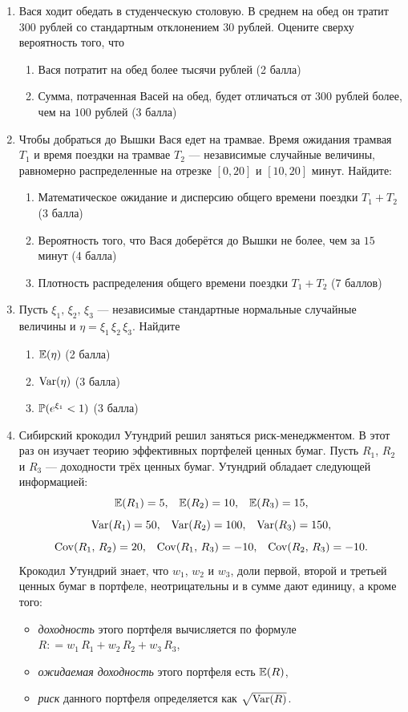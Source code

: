 \begin{enumerate}
    \item Вася ходит обедать в студенческую столовую. В среднем на обед он тратит
    $300$ рублей со стандартным отклонением $30$ рублей. Оцените сверху вероятность
    того, что
    \begin{enumerate}
    \item Вася потратит на обед более тысячи рублей (2 балла)
\item Сумма, потраченная Васей на обед, будет отличаться от $300$ рублей более,
чем на $100$ рублей (3 балла)
\end{enumerate}

    \item Чтобы добраться до Вышки Вася едет на трамвае. Время ожидания трамвая
    $T_{1}$ и время поездки на трамвае $T_{2}$ — независимые случайные величины,
    равномерно распределенные на отрезке $[0,20]$ и $[10,20]$ минут. Найдите:

    \begin{enumerate}
    \item Математическое ожидание и дисперсию общего времени поездки $T_{1}+T_{2}$ (3 балла)
    \item Вероятность того, что Вася доберётся до Вышки не более, чем за $15$ минут (4 балла)
    \item Плотность распределения общего времени поездки $T_{1}+T_{2}$ (7 баллов)
\end{enumerate}

    \item Пусть $\xi_1, \, \xi_2, \, \xi_3$ — независимые стандартные нормальные
    случайные величины и $\eta = \xi_1 \, \xi_2 \, \xi_3$. Найдите
\begin{enumerate}
  \item $\E(\eta)$ (2 балла)
  \item $\Var(\eta)$ (3 балла)
  \item $\P(e^{\xi_1} < 1)$ (3 балла)
\end{enumerate}

    \item Сибирский крокодил Утундрий решил заняться риск-менеджментом. В этот раз
    он изучает теорию эффективных портфелей ценных бумаг. Пусть $R_1$, $R_2$ и $R_3$ —
    доходности трёх ценных бумаг. Утундрий обладает следующей информацией:
\[
    \E(R_1) = 5, \;\;\; \E(R_2) = 10, \;\;\; \E(R_3) = 15,
\]
\[
    \Var(R_1) = 50, \;\;\; \Var(R_2) = 100, \;\;\; \Var(R_3) = 150,
\]
\[
    \Cov(R_1, \, R_2) = 20, \;\;\; \Cov(R_1, \, R_3) = -10, \;\;\; \Cov(R_2, \, R_3) = -10.
\]
Крокодил Утундрий знает, что $w_1$, $w_2$ и $w_3$, доли первой, второй и третьей
ценных бумаг в портфеле, неотрицательны и в сумме дают единицу, а кроме того:
\begin{itemize}
  \item \textit{доходность} этого портфеля вычисляется по формуле
  $R : = w_1 \, R_1 + w_2 \, R_2 + w_3 \, R_3$,
  \item \textit{ожидаемая доходность} этого портфеля есть $\E(R)$,
  \item \textit{риск} данного портфеля определяется как $\sqrt{\Var(R)}$.
\end{itemize}


\end{enumerate}
